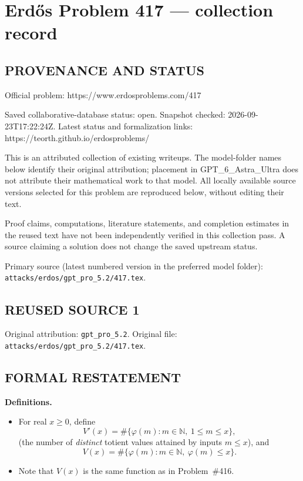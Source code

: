 \section*{Erd\H{o}s Problem 417 --- collection record}

\subsection*{PROVENANCE AND STATUS}
Official problem: https://www.erdosproblems.com/417

Saved collaborative-database status: open.
Snapshot checked: 2026-09-23T17:22:24Z.
Latest status and formalization links: https://teorth.github.io/erdosproblems/

This is an attributed collection of existing writeups. The model-folder names below identify their original attribution; placement in GPT\_6\_Astra\_Ultra does not attribute their mathematical work to that model. All locally available source versions selected for this problem are reproduced below, without editing their text.

Proof claims, computations, literature statements, and completion estimates in the reused text have not been independently verified in this collection pass. A source claiming a solution does not change the saved upstream status.

Primary source (latest numbered version in the preferred model folder): \texttt{attacks/erdos/gpt\_pro\_5.2/417.tex}.

\subsection*{REUSED SOURCE 1}
Original attribution: \texttt{gpt\_pro\_5.2}.
Original file: \texttt{attacks/erdos/gpt\_pro\_5.2/417.tex}.


\subsection*{FORMAL RESTATEMENT}
\textbf{Definitions.}
\begin{itemize}
\item For real $x\ge 0$, define
\[
V'(x)=\#\{\varphi(m): m\in\mathbb{N},\ 1\le m\le x\},
\]
(the number of \emph{distinct} totient values attained by inputs $m\le x$), and
\[
V(x)=\#\{\varphi(m): m\in\mathbb{N},\ \varphi(m)\le x\}.
\]
\item Note that $V(x)$ is the same function as in Problem~\#416.
\end{itemize}

